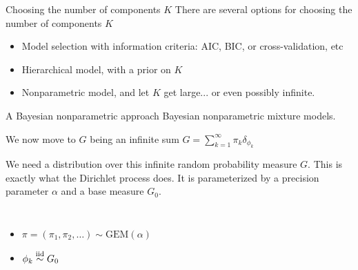 \begin{frame}{Choosing the number of components $K$}
There are several options for choosing the \alert{number of components} $K$
\begin{itemize}
	\item Model selection with  \alert{information criteria}: AIC, BIC, or cross-validation, etc
	\item  \alert{Hierarchical model}, with a prior on $K$
	\item  \alert{Nonparametric model}, and let $K$ get large... or even possibly infinite. 
\end{itemize}
	
\end{frame}



\begin{frame}{A {Bayesian nonparametric} approach}
	 \alert{Bayesian nonparametric}   mixture models.
	 
	 We now move to $G$ being an infinite sum $G = \sum_{k=1}^\infty \pi_k \delta_{\phi_k}$ 
	
We need a distribution over this infinite random probability measure $G$. This is exactly what the \alert{Dirichlet process} does. It is parameterized by a precision parameter $\alpha$ and a base measure $G_0$.

\begin{columns}
\begin{itemize}
	\item $\pi = (\pi_1,\pi_2,\ldots)\sim \text{GEM}(\alpha)$
	\item $\phi_k\stackrel{\mbox{\scriptsize{iid}}}{\sim} G_0$
\end{itemize}


\end{columns}
\end{frame}
